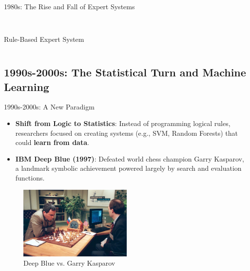 \documentclass{beamer}
\begin{document}
\begin{frame}[t]{1980s: The Rise and Fall of Expert Systems}
\begin{columns}
\begin{column}{0.4\textwidth}
        \\\scriptsize{Rule-Based Expert System}
    \end{column}
\end{columns}
\end{frame}

\subsection{1990s-2000s: The Statistical Turn and Machine Learning}

\begin{frame}[t]{1990s-2000s: A New Paradigm}
\begin{itemize}
    \item \textbf{Shift from Logic to Statistics}: Instead of programming logical rules, researchers focused on creating systems (e.g., SVM, Random Forests) that could \textbf{learn from data}.
    \item \textbf{IBM Deep Blue (1997)}: Defeated world chess champion Garry Kasparov, a landmark symbolic achievement powered largely by search and evaluation functions.
\end{itemize}
    \begin{figure}
        \includegraphics[width=0.5\textwidth]{images/Garry-Kasparov-Deep-Blue-IBM-computer.jpg}
        \caption{Deep Blue vs. Garry Kasparov}
    \end{figure}
\end{frame}
\end{document}
